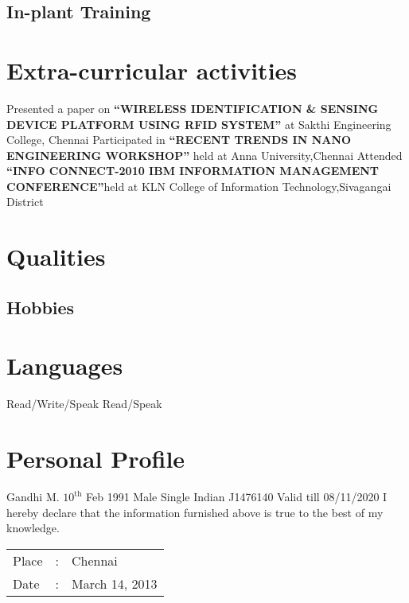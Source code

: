 \documentclass [a4paper,11pt]{moderncv}
\begin{document}
\subsection {In-plant Training}
\section {Extra-curricular activities}
\cvline {} {Presented a paper on \textbf{``WIRELESS IDENTIFICATION \& SENSING DEVICE PLATFORM USING RFID SYSTEM''} at Sakthi Engineering College, Chennai}
\cvline {} {Participated in \textbf{``RECENT TRENDS IN NANO ENGINEERING WORKSHOP''} held at Anna University,Chennai}
\cvline {} {Attended \textbf{``INFO CONNECT-2010 IBM INFORMATION MANAGEMENT CONFERENCE''}held at KLN College of Information Technology,Sivagangai District}

\section {Qualities}
\subsection{Hobbies}

\section{Languages}
 {Read/Write/Speak}
 {Read/Speak}

\section {Personal Profile}
 {Gandhi M.}
 {$10^{\mathrm{th}}$ Feb 1991}
 {Male}
 {Single}
 {Indian}
 {J1476140 Valid till 08/11/2020}
\vspace {4pt}
I hereby declare that the information furnished above is true to the best of my knowledge.\\

\begin{tabular}{|l c l|}
Place \hspace{4pt} &:& \hspace{2pt}Chennai\\
Date\hspace{4pt}  &:& \hspace{2pt}March 14, 2013 \\
\end{tabular}
\end{document}
